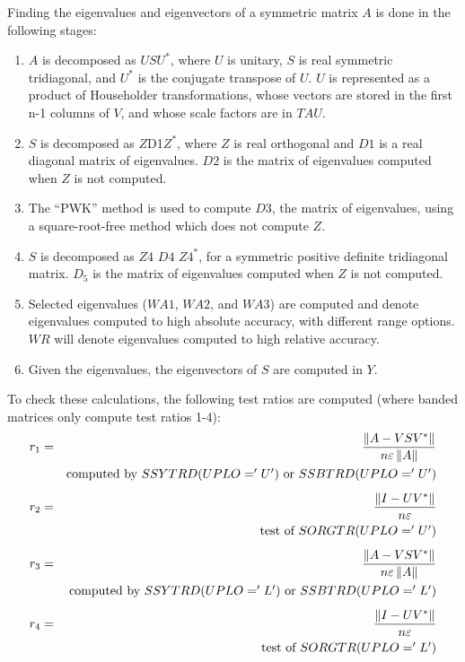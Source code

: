 \dent
Finding the eigenvalues and eigenvectors of a symmetric
matrix $A$ is done in the following stages:

\begin{enumerate}

\item
$A$ is decomposed as $U S U^*$, where $U$ is unitary,
$S$ is real symmetric tridiagonal, and $U^*$ is the
conjugate transpose of $U$.
$U$ is represented as a product of Householder
transformations, whose vectors are stored in the first
n-1 columns of $V$, and whose scale factors are in $TAU$.

\item
$S$ is decomposed as $Z $D1$ Z^*$, where $Z$ is real
orthogonal and $D1$ is a real diagonal matrix of eigenvalues.
$D2$ is the matrix of eigenvalues computed when $Z$ is not computed.

\item
The ``PWK'' method is used to compute $D3$, the matrix of eigenvalues,
using a square-root-free method which does not compute $Z$.

\item
$S$ is decomposed as $Z4$ $D4$ $Z4^*$, for a symmetric positive
definite tridiagonal matrix.
$D_5$ is the matrix of eigenvalues computed when $Z$ is not computed.

\item
Selected eigenvalues ($WA1$, $WA2$, and $WA3$) are computed and denote
eigenvalues computed to high absolute accuracy, with different range options.
$WR$ will denote eigenvalues computed to high relative
accuracy.

\item
Given the eigenvalues, the eigenvectors of $S$ are computed in $Y$.
\end{enumerate}

To check these calculations, the following test ratios are computed
(where banded matrices only compute test ratios 1-4):
\begin{eqnarray}
	r_1&=&\frac{ \left\| A - V S V^* \right\| }
                   { n \varepsilon \left\| A\right\| } \nonumber\\
           & &\mbox{computed by $SSYTRD(UPLO='U')$ or $SSBTRD(UPLO='U')$} \nonumber\\[1ex]
	r_2&=&\frac{ \left\| I - U V^*   \right\| }
                   { n          \varepsilon } \nonumber\\
           & &\mbox{test of $SORGTR(UPLO='U')$} \nonumber\\[1ex]
	r_3&=&\frac{ \left\| A - V S V^*   \right\| }
                   { n \varepsilon \left\| A\right\| } \nonumber\\
           & &\mbox{computed by $SSYTRD(UPLO='L')$ or $SSBTRD(UPLO='L')$} \nonumber\\[1ex]
	r_4&=&\frac{ \left\| I - U V^*   \right\| }
                   { n          \varepsilon } \nonumber\\
           & &\mbox{test of $SORGTR(UPLO='L')$} \nonumber
\end{eqnarray}

